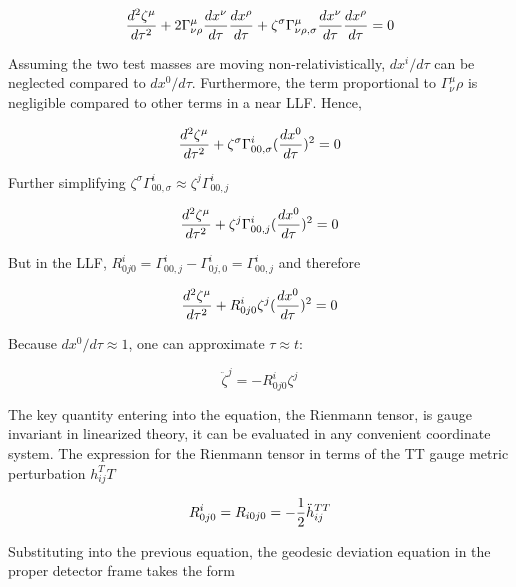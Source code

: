 \documentclass[binding=0.6cm, LaM]{sapthesis}
\begin{document}
		\begin{equation}
		{{d^2\zeta^{\mu}}\over{d\tau^2}} + 2\Gamma^{\mu}_{\nu\rho}{{dx^{\nu}}\over{d\tau}}{{dx^\rho}\over{d\tau}} + \zeta^{\sigma}\Gamma^{\mu}_{\nu\rho,\sigma}{{dx^{\nu}}\over{d\tau}}{{dx^{\rho}}\over{d\tau}} = 0
		\end{equation}

	Assuming the two test masses are moving non-relativistically, $dx^i/d\tau$ can be neglected compared to $dx^0/d\tau$.
	Furthermore, the term proportional to $\Gamma^{\mu}_\nu\rho{}$ is negligible compared to other terms in a near LLF. Hence,

		\begin{equation}
		{{d^2\zeta^{\mu}}\over{d\tau^2}} + \zeta^{\sigma}\Gamma^{i}_{00, \sigma}({{dx^0}\over{d\tau}})^2 = 0
		\end{equation}

	Further simplifying $\zeta^{\sigma}\Gamma^{i}_{00, \sigma} \approx \zeta^{j}\Gamma^{i}_{00, j}$

		\begin{equation}
		{{d^2\zeta^{\mu}}\over{d\tau^2}} + \zeta^{j}\Gamma^{i}_{00,j}({{dx^0}\over{d\tau}})^2 = 0
		\end{equation}

	But in the LLF, $R^i_{0j0} = \Gamma^i_{00,j} - \Gamma^i_{0j,0} = \Gamma^i_{00,j}$ and therefore

		\begin{equation}
		{{d^2\zeta^{\mu}}\over{d\tau^2}} + R^i_{0j0} \zeta^j({{dx^0}\over{d\tau}})^2 = 0
		\end{equation}

	Because $dx^0/d\tau \approx 1$, one can approximate $\tau \approx t$:

		\begin{equation}
		{\ddot \zeta}^j = - R^i_{0j0}\zeta^j
		\end{equation}
	
	The key quantity entering into the equation, the Rienmann tensor, is gauge invariant in linearized theory, 
	it can be evaluated in any convenient coordinate system.
	The expression for the Rienmann tensor in terms of the TT gauge metric perturbation $h_{ij}^TT$

		\begin{equation}
		R^i_{0j0} = R_{i0j0} = - {1 \over 2}{\ddot h}_{ij}^{TT}
		\end{equation}

	Substituting into the previous equation, the geodesic deviation equation in the proper detector frame takes the form
\end{document}

